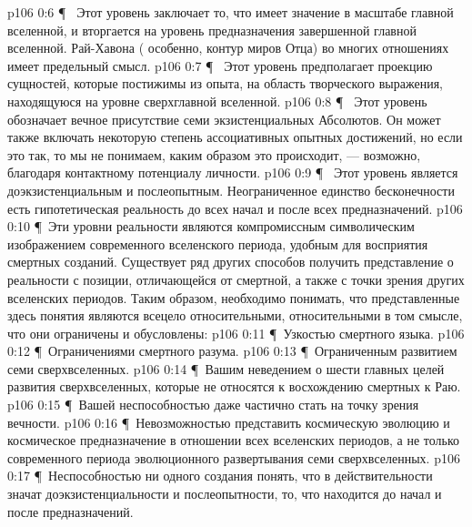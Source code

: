 \vs p106 0:6 \P\ \bibnobreakspace {} Этот уровень заключает то, что имеет значение в масштабе главной вселенной, и вторгается на уровень предназначения завершенной главной вселенной. Рай\hyp{}Хавона ( особенно, контур миров Отца) во многих отношениях имеет предельный смысл.
\vs p106 0:7 \P\ \bibnobreakspace {} Этот уровень предполагает проекцию сущностей, которые постижимы из опыта, на область творческого выражения, находящуюся на уровне сверхглавной вселенной.
\vs p106 0:8 \P\ \bibnobreakspace {} Этот уровень обозначает вечное присутствие семи экзистенциальных Абсолютов. Он может также включать некоторую степень ассоциативных опытных достижений, но если это так, то мы не понимаем, каким образом это происходит, --- возможно, благодаря контактному потенциалу личности.
\vs p106 0:9 \P\ \bibnobreakspace {} Этот уровень является доэкзистенциальным и послеопытным. Неограниченное единство бесконечности есть гипотетическая реальность до всех начал и после всех предназначений.
\vs p106 0:10 \P\ Эти уровни реальности являются компромиссным символическим изображением современного вселенского периода, удобным для восприятия смертных созданий. Существует ряд других способов получить представление о реальности с позиции, отличающейся от смертной, а также с точки зрения других вселенских периодов. Таким образом, необходимо понимать, что представленные здесь понятия являются всецело относительными, относительными в том смысле, что они ограничены и обусловлены:
\vs p106 0:11 \P\ \bibnobreakspace Узкостью смертного языка.
\vs p106 0:12 \P\ \bibnobreakspace Ограничениями смертного разума.
\vs p106 0:13 \P\ \bibnobreakspace Ограниченным развитием семи сверхвселенных.
\vs p106 0:14 \P\ \bibnobreakspace Вашим неведением о шести главных целей развития сверхвселенных, которые не относятся к восхождению смертных к Раю.
\vs p106 0:15 \P\ \bibnobreakspace Вашей неспособностью даже частично стать на точку зрения вечности.
\vs p106 0:16 \P\ \bibnobreakspace Невозможностью представить космическую эволюцию и космическое предназначение в отношении всех вселенских периодов, а не только современного периода эволюционного развертывания семи сверхвселенных.
\vs p106 0:17 \P\ \bibnobreakspace Неспособностью ни одного создания понять, что в действительности значат доэкзистенциальности и послеопытности, то, что находится до начал и после предназначений.
